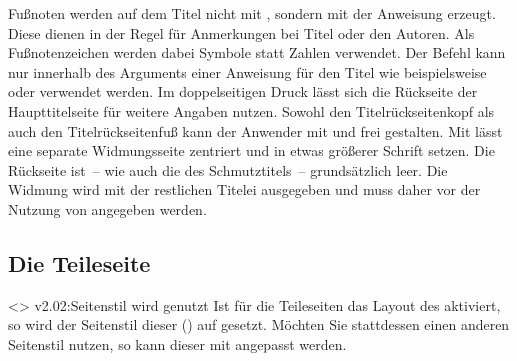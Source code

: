 \begin{DeclareEntity*}{}
\begin{DeclareEntity*}{}
\begin{DeclareEntity*}{}
\begin{Declaration}
\begin{Declaration}
\begin{Declaration}
\begin{Declaration}
\begin{Declaration}
\begin{Declaration}
\begin{Declaration}
\begin{Declaration}
Fußnoten werden auf dem Titel nicht mit , sondern mit der 
Anweisung  erzeugt. Diese dienen in der Regel für Anmerkungen bei 
Titel oder den Autoren. Als Fußnotenzeichen werden dabei Symbole statt Zahlen 
verwendet. Der Befehl  kann nur innerhalb des Arguments einer 
Anweisung für den Titel wie beispielsweise  oder  
verwendet werden.
%
Im doppelseitigen Druck lässt sich die Rückseite der Haupttitelseite für 
weitere Angaben nutzen. Sowohl den Titelrückseitenkopf als auch den
Titelrückseitenfuß kann der Anwender mit  und 
 frei gestalten. Mit  lässt eine 
separate Widmungsseite zentriert und in etwas größerer Schrift setzen. Die 
Rückseite ist~-- wie auch die des Schmutztitels~-- grundsätzlich leer. Die 
Widmung wird mit der restlichen Titelei ausgegeben und muss daher vor der 
Nutzung von  angegeben werden.
%
\end{Declaration}
\end{Declaration}
\end{Declaration}
\end{Declaration}
\end{Declaration}
\end{Declaration}
\end{Declaration}
\end{Declaration}



\subsection{%
  Die Teileseite%
  \label{sec:part}%
}
%
\ChangedAt<>{%
  v2.02:Seitenstil  wird genutzt%
}%
Ist für die Teileseiten das Layout des \CDs aktiviert, so wird der Seitenstil 
dieser () auf  gesetzt. 
Möchten Sie stattdessen einen anderen Seitenstil nutzen, so kann dieser mit 
angepasst werden.


\end{DeclareEntity*}
\end{DeclareEntity*}
\end{DeclareEntity*}
